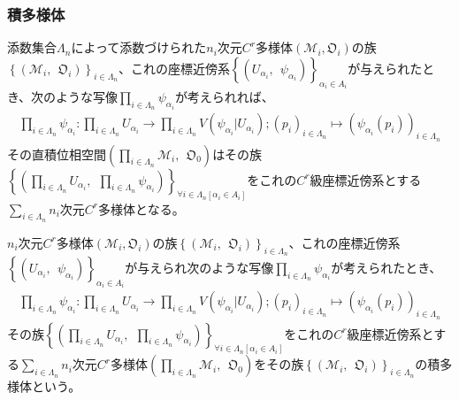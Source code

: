 \documentclass[dvipdfmx]{jsarticle}
\begin{document}
\subsubsection{積多様体}%
\begin{thm}\label{8.3.1.9}
添数集合$\varLambda_{n}$によって添数づけられた$n_{i}$次元$C^{r}$多様体$\left( \mathcal{M}_{i},\mathfrak{O}_{i} \right)$の族$\left\{ \left( \mathcal{M}_{i},\ \ \mathfrak{O}_{i} \right) \right\}_{i \in \varLambda_{n}}$、これの座標近傍系$\left\{ \left( U_{\alpha_{i}},\ \ \psi_{\alpha_{i}} \right) \right\}_{\alpha_{i} \in A_{i}}$が与えられたとき、次のような写像$\prod_{i \in \varLambda_{n}} \psi_{\alpha_{i}}$が考えられれば、
\begin{align*}
\prod_{i \in \varLambda_{n}} \psi_{\alpha_{i}}:\prod_{i \in \varLambda_{n}} U_{\alpha_{i}} \rightarrow \prod_{i \in \varLambda_{n}} {V\left( \psi_{\alpha_{i}}|U_{\alpha_{i}} \right)};\left( p_{i} \right)_{i \in \varLambda_{n}} \mapsto \left( \psi_{\alpha_{i}}\left( p_{i} \right) \right)_{i \in \varLambda_{n}}
\end{align*}
その直積位相空間$\left( \prod_{i \in \varLambda_{n}} \mathcal{M}_{i},\ \ \mathfrak{O}_{0} \right)$はその族$\left\{ \left( \prod_{i \in \varLambda_{n}} U_{\alpha_{i}},\ \ \prod_{i \in \varLambda_{n}} \psi_{\alpha_{i}} \right) \right\}_{\forall i \in \varLambda_{n}\left[ \alpha_{i} \in A_{i} \right]}$をこれの$C^{r}$級座標近傍系とする$\sum_{i \in \varLambda_{n}} n_{i}$次元$C^{r}$多様体となる。
\end{thm}
\begin{dfn}
$n_{i}$次元$C^{r}$多様体$\left( \mathcal{M}_{i},\mathfrak{O}_{i} \right)$の族$\left\{ \left( \mathcal{M}_{i},\ \ \mathfrak{O}_{i} \right) \right\}_{i \in \varLambda_{n}}$、これの座標近傍系$\left\{ \left( U_{\alpha_{i}},\ \ \psi_{\alpha_{i}} \right) \right\}_{\alpha_{i} \in A_{i}}$が与えられ次のような写像$\prod_{i \in \varLambda_{n}} \psi_{\alpha_{i}}$が考えられたとき、
\begin{align*}
\prod_{i \in \varLambda_{n}} \psi_{\alpha_{i}}:\prod_{i \in \varLambda_{n}} U_{\alpha_{i}} \rightarrow \prod_{i \in \varLambda_{n}} {V\left( \psi_{\alpha_{i}}|U_{\alpha_{i}} \right)};\left( p_{i} \right)_{i \in \varLambda_{n}} \mapsto \left( \psi_{\alpha_{i}}\left( p_{i} \right) \right)_{i \in \varLambda_{n}}
\end{align*}
その族$\left\{ \left( \prod_{i \in \varLambda_{n}} U_{\alpha_{i}},\ \ \prod_{i \in \varLambda_{n}} \psi_{\alpha_{i}} \right) \right\}_{\forall i \in \varLambda_{n}\left[ \alpha_{i} \in A_{i} \right]}$をこれの$C^{r}$級座標近傍系とする$\sum_{i \in \varLambda_{n}} n_{i}$次元$C^{r}$多様体$\left( \prod_{i \in \varLambda_{n}} \mathcal{M}_{i},\ \ \mathfrak{O}_{0} \right)$をその族$\left\{ \left( \mathcal{M}_{i},\ \ \mathfrak{O}_{i} \right) \right\}_{i \in \varLambda_{n}}$の積多様体という。
\end{dfn}
\end{document}
